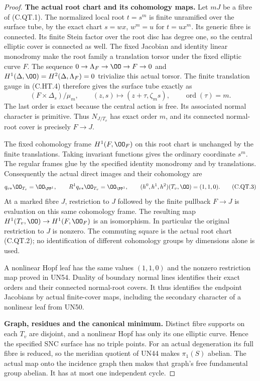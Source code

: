 \begin{proof}
\par\medskip\noindent\textbf{The actual root chart and its cohomology maps.}
Let $mJ$ be a fibre of (C.QT.1). The normalized local root
$t=s^m$ is finite unramified over the surface tube, by
the exact chart $s=wx$, $w^m=u$ for $t=ux^m$.
Its generic fibre is connected. Its finite Stein factor
over the root disc has degree one, so the central
elliptic cover is connected as well. The fixed Jacobian
and identity linear monodromy make the root family a
translation torsor under the fixed elliptic curve $F$.
The sequence $0\to\Lambda_F\to\OO\to F\to0$ and
$H^1(\Delta,\OO)=H^2(\Delta,\Lambda_F)=0$ trivialize
this actual torsor. The finite translation gauge in
(C.HT.4) therefore gives the surface tube exactly as
\[
 (F\times\Delta_s)/\mu_m,
 \qquad(z,s)\longmapsto(z+\tau,\zeta_ms),
 \qquad\operatorname{ord}(\tau)=m.
\tag{C.QT.2}
\]
The last order is exact because the central action is
free. Its associated normal character is primitive.
Thus $N_{J/T_v}$ has exact order $m$, and its connected
normal-root cover is precisely $F\to J$.

The fixed cohomology frame $H^1(F,\OO_F)$ on this
root chart is unchanged by the finite translations.
Taking invariant functions gives the ordinary
coordinate $s^m$. The regular frames glue by the
specified identity monodromy and by translations.
Consequently the actual direct images and their
cohomology are
\[
 q_{v*}\OO_{T_v}=\OO_{\PP^1},\qquad
 R^1q_{v*}\OO_{T_v}=\OO_{\PP^1},\qquad
 (h^0,h^1,h^2)(T_v,\OO)=(1,1,0).
\tag{C.QT.3}
\]
At a marked fibre $J$, restriction to $J$ followed
by the finite pullback $F\to J$ is evaluation on this
same cohomology frame. The resulting map
$H^1(T_v,\OO)\to H^1(F,\OO_F)$ is an isomorphism.
In particular the original restriction to $J$ is
nonzero. The commuting square is the actual root
chart (C.QT.2); no identification of different
cohomology groups by dimensions alone is used.

A nonlinear Hopf leaf has the same values $(1,1,0)$
and the nonzero restriction map proved in UN54.
Duality of boundary normal lines identifies their
exact orders and their connected normal-root covers.
It thus identifies the endpoint Jacobians by actual
finite-cover maps, including the secondary character
of a nonlinear leaf from UN50.

\par\medskip\noindent\textbf{Graph, residues and the canonical minimum.}
Distinct fibre supports on each $T_v$ are disjoint,
and a nonlinear Hopf has only its one elliptic curve.
Hence the specified SNC surface has no triple points.
For an actual degeneration its full fibre is reduced,
so the meridian quotient of UN44 makes $\pi_1(S)$
abelian. The actual map onto the incidence graph
then makes that graph's free fundamental group
abelian. It has at most one independent cycle.


\end{proof}

